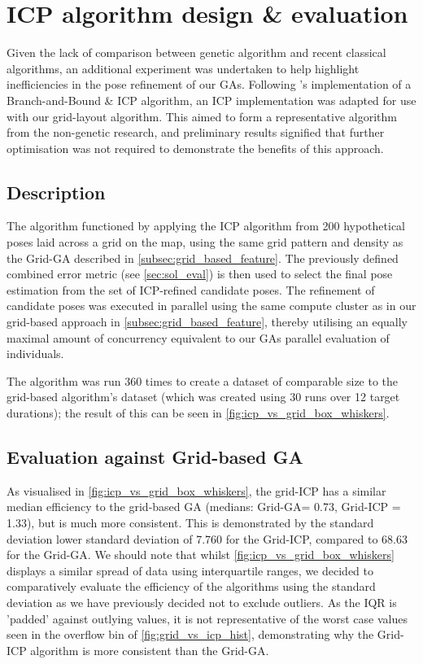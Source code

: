 \documentclass[authoryearcitations]{UoYCSproject}
\begin{document}
\chapter{ICP algorithm design \& evaluation}
\label{cha:icp_algorithm}
Given the lack of comparison between genetic algorithm and recent classical algorithms, an additional experiment was undertaken to help highlight inefficiencies in the pose refinement of our GAs. Following \citet{Yang2013-gx}'s implementation of a Branch-and-Bound \& ICP algorithm, an ICP implementation \cite{Harry_undated-ea} was adapted for use with our grid-layout algorithm. This aimed to form a representative algorithm from the non-genetic research, and preliminary results signified that further optimisation was not required to demonstrate the benefits of this approach.

\section{Description}
The algorithm functioned by applying the ICP algorithm from 200 hypothetical poses laid across a grid on the map, using the same grid pattern and density as the Grid-GA described in \autoref{subsec:grid_based_feature}. The previously defined combined error metric (see \autoref{sec:sol_eval}) is then used to select the final pose estimation from the set of ICP-refined candidate poses. The refinement of candidate poses was executed in parallel using the same compute cluster as in our grid-based approach in \autoref{subsec:grid_based_feature}, thereby utilising an equally maximal amount of concurrency equivalent to our GAs parallel evaluation of individuals.\newline

The algorithm was run 360 times to create a dataset of comparable size to the grid-based algorithm's dataset (which was created using 30 runs over 12 target durations); the result of this can be seen in \autoref{fig:icp_vs_grid_box_whiskers}. 


\section{Evaluation against Grid-based GA}

As visualised in \autoref{fig:icp_vs_grid_box_whiskers}, the grid-ICP has a similar median efficiency to the grid-based GA (medians: Grid-GA= 0.73, Grid-ICP = 1.33), but is much more consistent. This is demonstrated by the standard deviation lower standard deviation of 7.760 for the Grid-ICP, compared to 68.63 for the Grid-GA. We should note that whilst \autoref{fig:icp_vs_grid_box_whiskers} displays a similar spread of data using interquartile ranges, we decided to comparatively evaluate the efficiency of the algorithms using the standard deviation as we have previously decided not to exclude outliers. As the IQR is 'padded' against outlying values, it is not representative of the worst case values seen in the overflow bin of \autoref{fig:grid_vs_icp_hist}, demonstrating why the Grid-ICP algorithm is more consistent than the Grid-GA. 
\end{document}
